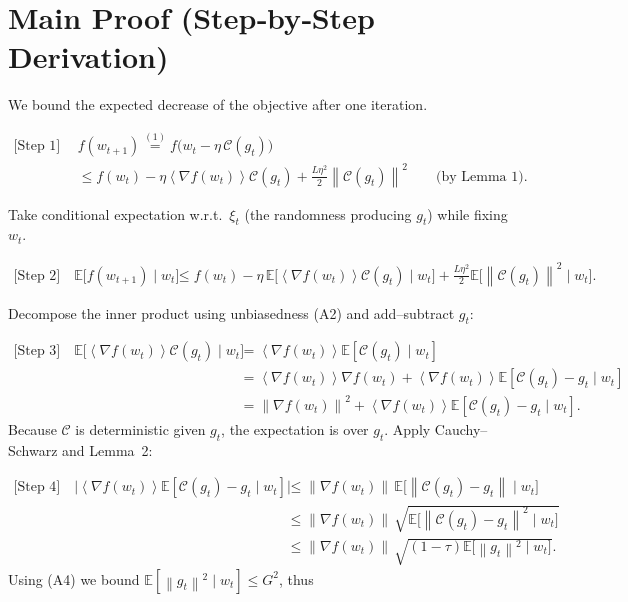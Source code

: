 \documentclass{article}
\newcommand{\E}{\mathbb{E}}
\newcommand{\norm}[1]{\left\|#1\right\|}
\newcommand{\inner}[1]{\left\langle #1 \right\rangle}
\begin{document}
\section*{Main Proof (Step‑by‑Step Derivation)}
We bound the expected decrease of the objective after one iteration.

\begin{align}
\text{[Step 1]} \quad
&f(w_{t+1}) \overset{(1)}{=} f\!\big(w_{t}-\eta\,\mathcal{C}(g_{t})\big) \nonumber\\
&\le f(w_{t})-\eta\inner{\nabla f(w_{t})}{\mathcal{C}(g_{t})}
+\frac{L\eta^{2}}{2}\norm{\mathcal{C}(g_{t})}^{2}
\qquad\text{(by Lemma 1)}. \tag{5}
\end{align}

Take conditional expectation w.r.t.\ $\xi_{t}$ (the randomness producing $g_{t}$) while fixing $w_{t}$.

\begin{align}
\text{[Step 2]} \quad
\E\!\big[f(w_{t+1})\mid w_{t}\big]
&\le f(w_{t})-\eta\,\E\!\big[\inner{\nabla f(w_{t})}{\mathcal{C}(g_{t})}\mid w_{t}\big]
+\frac{L\eta^{2}}{2}\E\!\big[\norm{\mathcal{C}(g_{t})}^{2}\mid w_{t}\big]. \tag{6}
\end{align}

Decompose the inner product using unbiasedness (A2) and add–subtract $g_{t}$:

\begin{align}
\text{[Step 3]} \quad
\E\!\big[\inner{\nabla f(w_{t})}{\mathcal{C}(g_{t})}\mid w_{t}\big]
&=\inner{\nabla f(w_{t})}{\E[\mathcal{C}(g_{t})\mid w_{t}] } \nonumber\\
&=\inner{\nabla f(w_{t})}{\nabla f(w_{t})}
   +\inner{\nabla f(w_{t})}{\E[\mathcal{C}(g_{t})-g_{t}\mid w_{t}] } \nonumber\\
&= \norm{\nabla f(w_{t})}^{2}
   +\inner{\nabla f(w_{t})}{\E[\mathcal{C}(g_{t})-g_{t}\mid w_{t}] }.
\tag{7}
\end{align}
Because $\mathcal{C}$ is deterministic given $g_{t}$, the expectation is over $g_{t}$.  
Apply Cauchy–Schwarz and Lemma~2:

\begin{align}
\text{[Step 4]} \quad
\big|\inner{\nabla f(w_{t})}{\E[\mathcal{C}(g_{t})-g_{t}\mid w_{t}] }\big|
&\le \norm{\nabla f(w_{t})}\,
   \E\!\big[\norm{\mathcal{C}(g_{t})-g_{t}}\mid w_{t}\big] \nonumber\\
&\le \norm{\nabla f(w_{t})}\,
   \sqrt{\E\!\big[\norm{\mathcal{C}(g_{t})-g_{t}}^{2}\mid w_{t}\big]} \nonumber\\
&\le \norm{\nabla f(w_{t})}\,
   \sqrt{(1-\tau)\E\!\big[\norm{g_{t}}^{2}\mid w_{t}\big]} .
\tag{8}
\end{align}
Using (A4) we bound $\E[\norm{g_{t}}^{2}\mid w_{t}]\le G^{2}$, thus
\end{document}
